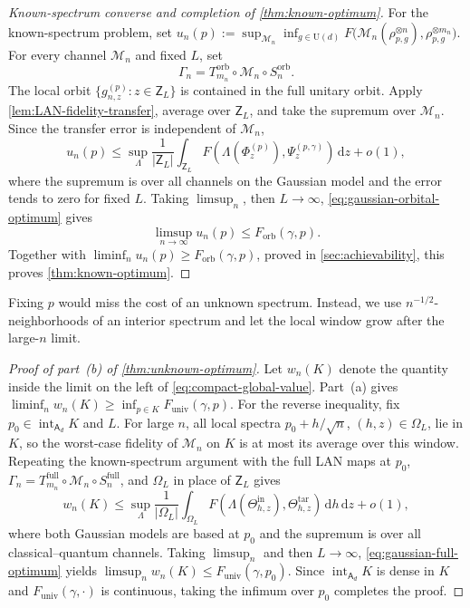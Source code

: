 \documentclass[11pt]{article}
\theoremstyle{remark}
\theoremstyle{plain}
\newcommand{\cM}{\mathcal M}
\newcommand{\U}{\mathrm U}
\newcommand{\dd}{\mathrm d}
\newcommand{\ot}{\otimes}
\newcommand{\Forb}{F_{\mathrm{orb}}}
\newcommand{\Funiv}{F_{\mathrm{univ}}}
\begin{document}
\begin{proof}[Known-spectrum converse and completion of \cref{thm:known-optimum}]
For the known-spectrum problem, set
\(u_n(p):=\sup_{\cM_n}\inf_{g\in\U(d)}
F\!\bigl(\cM_n(\rho_{p,g}^{\ot n}),\rho_{p,g}^{\ot m_n}\bigr)\).
For every channel \(\cM_n\) and fixed \(L\), set
\[
  \Gamma_n=T_{m_n}^{\mathrm{orb}}\circ\cM_n\circ S_n^{\mathrm{orb}}.
\]
The local orbit \(\{g_{n,z}^{(p)}:z\in\mathsf Z_L\}\) is contained in the full
unitary orbit.  Apply \cref{lem:LAN-fidelity-transfer}, average over
\(\mathsf Z_L\), and take the supremum over \(\cM_n\).  Since the transfer
error is independent of \(\cM_n\),
\[
  u_n(p)
  \le \sup_\Lambda\frac1{|\mathsf Z_L|}
  \int_{\mathsf Z_L}
  F(\Lambda(\Phi_z^{(p)}),\Psi_z^{(p,\gamma)})\,\dd z+o(1),
\]
where the supremum is over all channels on the Gaussian model and the
error tends to zero for fixed \(L\).  Taking \(\limsup_n\), then
\(L\to\infty\), \eqref{eq:gaussian-orbital-optimum} gives
\[
  \limsup_{n\to\infty} u_n(p)\le\Forb(\gamma,p).
\]
Together with
\(\liminf_n u_n(p)\ge\Forb(\gamma,p)\), proved in
\cref{sec:achievability}, this proves \cref{thm:known-optimum}.
\end{proof}

Fixing \(p\) would miss the cost of an unknown spectrum.  Instead, we use
\(n^{-1/2}\)-neighborhoods of an interior spectrum and let the local window
grow after the large-\(n\) limit.

\begin{proof}[Proof of part~\textup{(b)} of \cref{thm:unknown-optimum}]
Let \(w_n(K)\) denote the quantity inside the limit on the left of
\eqref{eq:compact-global-value}.  Part~\textup{(a)} gives
\(\liminf_nw_n(K)\ge\inf_{p\in K}\Funiv(\gamma,p)\).
For the reverse inequality, fix
\(p_0\in\operatorname{int}_{\mathsf A_d}K\) and \(L\).  For large \(n\),
all local spectra \(p_0+h/\sqrt n\), \((h,z)\in\Omega_L\), lie in \(K\), so
the worst-case fidelity of \(\cM_n\) on \(K\) is at most its average over
this window.  Repeating the known-spectrum argument with the full LAN maps
at \(p_0\), \(\Gamma_n=T_{m_n}^{\mathrm{full}}\circ\cM_n\circ
S_n^{\mathrm{full}}\), and \(\Omega_L\) in place of \(\mathsf Z_L\) gives
\[
  w_n(K)
  \le\sup_\Lambda\frac1{|\Omega_L|}\int_{\Omega_L}
  F\!\left(\Lambda(\Theta_{h,z}^{\mathrm{in}}),
                 \Theta_{h,z}^{\mathrm{tar}}\right)\,\dd h\,\dd z+o(1),
\]
where both Gaussian models are based at \(p_0\) and the supremum is over
all classical--quantum channels.  Taking \(\limsup_n\) and then
\(L\to\infty\), \eqref{eq:gaussian-full-optimum} yields
\(\limsup_nw_n(K)\le\Funiv(\gamma,p_0)\).  Since
\(\operatorname{int}_{\mathsf A_d}K\) is dense in \(K\) and
\(\Funiv(\gamma,\cdot)\) is continuous, taking the infimum over \(p_0\)
completes the proof.
\end{proof}
\end{document}
